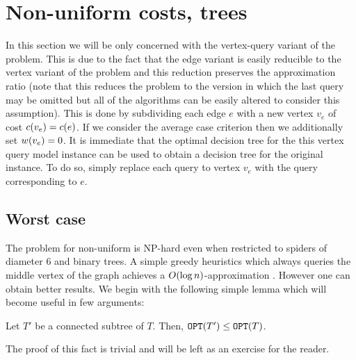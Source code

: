 \section{Non-uniform costs, trees}
In this section we will be only concerned with the vertex-query variant of the problem. This is due to the fact that the edge variant is easily reducible to the vertex variant of the problem and this reduction preserves the approximation ratio (note that this reduces the problem to the version in which the last query may be omitted but all of the algorithms can be easily altered to consider this assumption). This is done by subdividing each edge $e$ with a new vertex $v_e$ of cost $c\mathopen{}\left( v_e \right)=c\mathopen{}\left( e \right)$. If we consider the average case criterion then we additionally set $w\mathopen{}\left( v_e \right)=0$. It is immediate that the optimal decision tree for the this vertex query model instance can be used to obtain a decision tree for the original instance. To do so, simply replace each query to vertex $v_e$ with the query corresponding to $e$. 

\subsection{Worst case}

The problem for non-uniform is NP-hard even when restricted to spiders of diameter $6$ and binary trees.
A simple greedy heuristics which always queries the middle vertex of the graph achieves a $O\mathopen{}\left( \log n \right)$-approximation \cite{Dereniowski2009ERankOfWTs}. However one can obtain better results. 
We begin with the following simple lemma which will become useful in few arguments:
\begin{lemma}\label{lemma:subtreeCost}
    Let $T'$ be a connected subtree of $T$. Then, $\texttt{OPT}\mathopen{}\left( T' \right)\leq\texttt{OPT}\mathopen{}\left( T \right)$.
\end{lemma}
The proof of this fact is trivial and will be left as an exercise for the reader.
